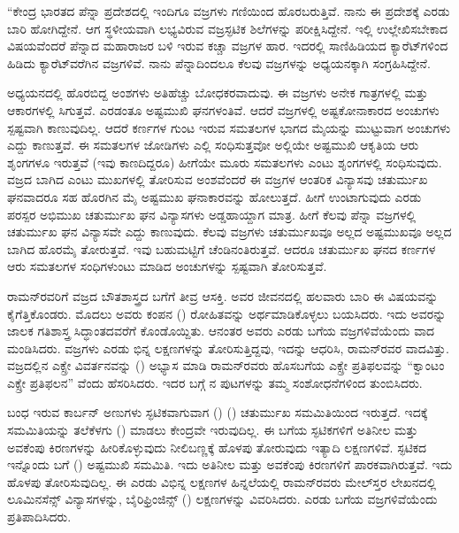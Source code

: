 “ಕೇಂದ್ರ ಭಾರತದ ಪೆನ್ನಾ ಪ್ರದೇಶದಲ್ಲಿ ಇಂದಿಗೂ ವಜ್ರಗಳು ಗಣಿಯಿಂದ ಹೊರಬರುತ್ತಿವೆ. ನಾನು ಈ ಪ್ರದೇಶಕ್ಕೆ ಎರಡು ಬಾರಿ ಹೋಗಿದ್ದೇನೆ. ಆಗ ಸ್ಥಳೀಯವಾಗಿ ಲಭ್ಯವಿರುವ ವಜ್ರಸ್ಫಟಿಕ ಶಿಲೆಗಳನ್ನು ಪರೀಕ್ಷಿಸಿದ್ದೇನೆ. ಇಲ್ಲಿ ಉಲ್ಲೇಖಿಸಬೇಕಾದ ವಿಷಯವೆಂದರೆ ಪೆನ್ನಾದ ಮಹಾರಾಜರ ಬಳಿ ಇರುವ  ಕಚ್ಚಾ ವಜ್ರಗಳ ಹಾರ. ಇದರಲ್ಲಿ ಸಾಣಿಹಿಡಿಯದ  ಕ್ಯಾರೆಟ್‍ಗಳಿಂದ ಹಿಡಿದು  ಕ್ಯಾರೆಟ್‍ವರೆಗಿನ ವಜ್ರಗಳಿವೆ. ನಾನು ಪೆನ್ನಾದಿಂದಲೂ ಕೆಲವು ವಜ್ರಗಳನ್ನು ಅಧ್ಯಯನಕ್ಕಾಗಿ ಸಂಗ್ರಹಿಸಿದ್ದೇನೆ.

ಅಧ್ಯಯನದಲ್ಲಿ ಹೊರಬಿದ್ದ ಅಂಶಗಳು ಅತಿಹೆಚ್ಚು ಬೋಧಕರವಾದುವು. ಈ ವಜ್ರಗಳು ಅನೇಕ ಗಾತ್ರಗಳಲ್ಲಿ ಮತ್ತು ಆಕಾರಗಳಲ್ಲಿ ಸಿಗುತ್ತವೆ. ಎರಡಂತೂ ಅಷ್ಟಮುಖಿ ಘನಗಳಂತಿವೆ. ಆದರೆ ವಜ್ರಗಳಲ್ಲಿ ಅಷ್ಟಕೋನಾಕಾರದ ಅಂಚುಗಳು ಸ್ಪಷ್ಟವಾಗಿ ಕಾಣುವುದಿಲ್ಲ. ಆದರೆ ಕರ್ಣಗಳ ಗುಂಟ ಇರುವ ಸಮತಲಗಳ ಭಾಗದ ಮೈಯನ್ನು ಮುಟ್ಟುವಾಗ ಅಂಚುಗಳು ಎದ್ದು ಕಾಣುತ್ತವೆ. ಈ ಸಮತಲಗಳ ಜೋಡಿಗಳು ಎಲ್ಲಿ ಸಂಧಿಸುತ್ತವೋ ಅಲ್ಲಿಯೇ ಅಷ್ಟಮುಖಿ ಆಕೃತಿಯ ಆರು ಶೃಂಗಗಳೂ ಇರುತ್ತವೆ (ಇವು ಕಾಣದಿದ್ದರೂ) ಹೀಗೆಯೇ ಮೂರು ಸಮತಲಗಳು ಎಂಟು ಶೃಂಗಗಳಲ್ಲಿ ಸಂಧಿಸುವುದು. ವಜ್ರದ ಬಾಗಿದ ಎಂಟು ಮುಖಗಳಲ್ಲಿ ತೋರಿಸುವ ಅಂಶವೆಂದರೆ ಈ ವಜ್ರಗಳ ಆಂತರಿಕ ವಿನ್ಯಾಸವು ಚತುರ್ಮುಖ ಘನವಾದರೂ ಸಹ ಹೊರಗಿನ ಮೈ ಅಷ್ಟಮುಖ ಘನಾಕಾರವನ್ನು ಹೋಲುತ್ತದೆ. ಹೀಗೆ ಉಂಟಾಗುವುದು  ಎರಡು ಪರಸ್ಪರ ಅಭಿಮುಖ ಚತುರ್ಮುಖ ಘನ ವಿನ್ಯಾಸಗಳು ಅಡ್ಡಹಾಯ್ದಾಗ ಮಾತ್ರ. ಹೀಗೆ ಕೆಲವು ಪೆನ್ನಾ ವಜ್ರಗಳಲ್ಲಿ ಚತುರ್ಮುಖ ಘನ ವಿನ್ಯಾಸವೇ ಎದ್ದು ಕಾಣುವುದು. ಕೆಲವು ವಜ್ರಗಳು ಚತುರ್ಮುಖವೂ ಅಲ್ಲದ ಅಷ್ಟಮುಖವೂ ಅಲ್ಲದ ಬಾಗಿದ ಹೊರಮೈ ತೋರುತ್ತವೆ. ಇವು ಬಹುಮಟ್ಟಿಗೆ ಚೆಂಡಿನಂತಿರುತ್ತವೆ. ಆದರೂ ಚತುರ್ಮುಖ ಘನದ ಕರ್ಣಗಳ ಆರು ಸಮತಲಗಳ ಸಂಧಿಗಳುಂಟು ಮಾಡಿದ ಅಂಚುಗಳನ್ನು ಸ್ಪಷ್ಟವಾಗಿ ತೋರಿಸುತ್ತವೆ.



ರಾಮನ್‍ರವರಿಗೆ ವಜ್ರದ ಬೌತಶಾಸ್ತ್ರದ ಬಗೆಗೆ ತೀವ್ರ ಆಸಕ್ತಿ. ಅವರ ಜೀವನದಲ್ಲಿ ಹಲವಾರು ಬಾರಿ ಈ ವಿಷಯವನ್ನು ಕೈಗೆತ್ತಿಕೊಂಡರು. ಮೊದಲು ಅವರು ಕಂಪನ () ರೋಹಿತವನ್ನು ಅರ್ಥಮಾಡಿಕೊಳ್ಳಲು ಬಯಸಿದರು. ಇದು ಅವರನ್ನು ಜಾಲಕ ಗತಿಶಾಸ್ತ್ರ ಸಿದ್ಧಾಂತದವರೆಗೆ ಕೊಂಡೊಯ್ದಿತು. ಆನಂತರ ಅವರು ಎರಡು ಬಗೆಯ ವಜ್ರಗಳಿವೆಯೆಂದು ವಾದ ಮಂಡಿಸಿದರು. ವಜ್ರಗಳು ಎರಡು ಭಿನ್ನ ಲಕ್ಷಣಗಳನ್ನು ತೋರಿಸುತ್ತಿದ್ದವು, ಇದನ್ನು ಆಧರಿಸಿ, ರಾಮನ್‍ರವರ ವಾದವಿತ್ತು. ವಜ್ರದಲ್ಲಿನ ಎಕ್ಸ್ರೇ ವಿವರ್ತನವನ್ನು () ಅಭ್ಯಾಸ ಮಾಡಿ ರಾಮನ್‍ರವರು ಹೊಸಬಗೆಯ ಎಕ್ಸ್ರೇ ಪ್ರತಿಫಲವನ್ನು “ಕ್ವಾಂಟಂ ಎಕ್ಸ್ರೇ ಪ್ರತಿಫಲನ” ವೆಂದು ಹೆಸರಿಸಿದರು. ಇದರ ಬಗ್ಗೆ \textit{}ನ ಪುಟಗಳನ್ನು ತಮ್ಮ ಸಂಶೋಧನೆಗಳಿಂದ ತುಂಬಿಸಿದರು.

 ಬಂಧ ಇರುವ ಕಾರ್ಬನ್ ಅಣುಗಳು ಸ್ಫಟಿಕವಾಗುವಾಗ () () ಚತುರ್ಮುಖ ಸಮಮಿತಿಯಿಂದ ಇರುತ್ತದೆ. ಇದಕ್ಕೆ ಸಮಮಿತಿಯನ್ನು ತಲೆಕೆಳಗು () ಮಾಡಲು ಕೇಂದ್ರವೇ ಇರುವುದಿಲ್ಲ. ಈ ಬಗೆಯ ಸ್ಫಟಿಕಗಳಿಗೆ ಅತಿನೀಲ ಮತ್ತು ಅವಕೆಂಪು ಕಿರಣಗಳನ್ನು ಹೀರಿಕೊಳ್ಳುವುದು ನೀಲಿಬಣ್ಣಕ್ಕೆ ಹೊಳಪು ತೋರುವುದು ಇತ್ಯಾದಿ ಲಕ್ಷಣಗಳಿವೆ. ಸ್ಫಟಿಕದ ಇನ್ನೊಂದು ಬಗೆ () ಅಷ್ಟಮುಖಿ ಸಮಮಿತಿ. ಇದು ಅತಿನೀಲ ಮತ್ತು ಅವಕೆಂಪು ಕಿರಣಗಳಿಗೆ ಪಾರಕವಾಗಿರುತ್ತವೆ. ಇದು ಹೊಳಪು ತೋರಿಸುವುದಿಲ್ಲ. ಈ ಎರಡು ವಿಭಿನ್ನ ಲಕ್ಷಣಗಳ ಹಿನ್ನಲೆಯಲ್ಲಿ ರಾಮನ್‍ರವರು ಮೇಲ್‍ಸ್ತರ ಲೇಖನದಲ್ಲಿ ಲೂಮಿನಸೆನ್ಸ್ ವಿನ್ಯಾಸಗಳನ್ನು, ಬೈರಿಫ್ರಿಂಜಿನ್ಸ್ ()  ಲಕ್ಷಣಗಳನ್ನು ವಿವರಿಸಿದರು. ಎರಡು ಬಗೆಯ ವಜ್ರಗಳಿವೆಯೆಂದು ಪ್ರತಿಪಾದಿಸಿದರು.

